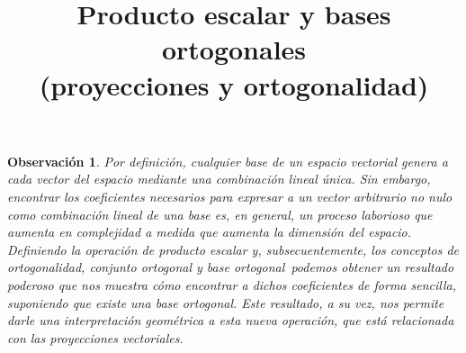 \documentclass[12pt,dvipsnames]{article}
\newtheorem{obs}{Observación}[section]
\numberwithin{equation}{section}
\begin{document}
\title{Producto escalar y bases ortogonales \\ (proyecciones y ortogonalidad)}
\date{}
\maketitle

\begin{obs}
    Por definición, cualquier base de un espacio vectorial genera a cada vector del espacio mediante una combinación lineal única. Sin embargo, encontrar los coeficientes necesarios para expresar a un vector arbitrario no nulo como combinación lineal de una base es, en general, un proceso laborioso que aumenta en complejidad a medida que aumenta la dimensión del espacio. Definiendo la operación de producto escalar \textemdash y, subsecuentemente, los conceptos de ortogonalidad, conjunto ortogonal y base ortogonal\textemdash \ podemos obtener un resultado poderoso que nos muestra cómo encontrar a dichos coeficientes de forma sencilla, suponiendo que existe una base ortogonal. Este resultado, a su vez, nos permite darle una interpretación geométrica a esta nueva operación, que está relacionada con las proyecciones vectoriales.
\end{obs}
\end{document}
